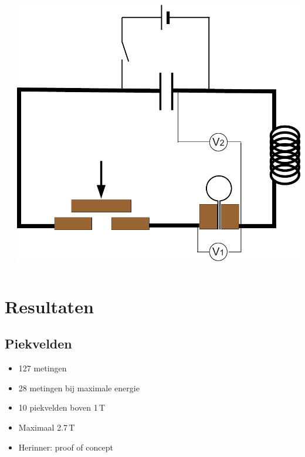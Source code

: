 \documentclass{beamer}
\newcommand{\includeGraph}[2]{
	\begin{center}
	\scalebox{#1}{
		
	}
	\end{center}
}
\begin{document}
\begin{frame}
\begin{columns}[c]
\begin{column}[c]{0.5\textwidth}
\includeGraph{0.65}{Ishunt}
\end{column}
\begin{column}[c]{0.5\textwidth}
\begin{center}
\includegraphics[width=1.0\textwidth]{images/circuit-new-inductance}
\end{center}
\end{column}
\end{columns}
\end{frame}

\section{Resultaten}
\subsection{Piekvelden}
\begin{frame}
\begin{itemize}
\item 127 metingen
\item 28 metingen bij maximale energie
\item 10 piekvelden boven 1\,T
\item Maximaal 2.7\,T
\item Herinner: proof of concept
\end{itemize}
\end{frame}
\end{document}
